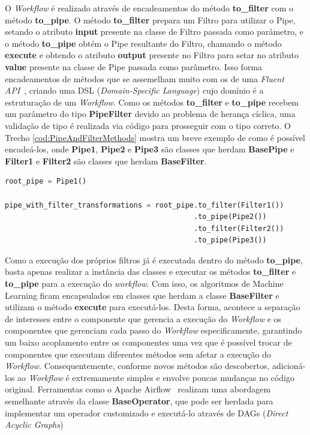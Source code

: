 \documentclass[portugues]{ic-tese}
\begin{document}
O \textit{Workflow} é realizado através de encadeamentos do método \textbf{to\_filter} com o método \textbf{to\_pipe}. O método \textbf{to\_filter} prepara um Filtro para utilizar o Pipe, setando o atributo \textbf{input} presente na classe de Filtro passada como parâmetro, e o método \textbf{to\_pipe} obtém o Pipe resultante do Filtro, chamando o método \textbf{execute} e obtendo o atributo \textbf{output} presente no Filtro para setar no atributo \textbf{value} presente na classe de Pipe passada como parâmetro. Isso forma encadeamentos de métodos que se assemelham muito com os de uma \textit{Fluent API}~\citep{Fowler_2005}, criando uma DSL (\textit{Domain-Specific Language}) cujo domínio é a estruturação de um \textit{Workflow}. Como os métodos \textbf{to\_filter} e \textbf{to\_pipe} recebem um parâmetro do tipo \textbf{PipeFilter} devido ao problema de herança cíclica, uma validação de tipo é realizada via código para prosseguir com o tipo correto. O Trecho \ref{cod:PipeAndFilterMethods} mostra um breve exemplo de como é possível encadeá-los, onde \textbf{Pipe1}, \textbf{Pipe2} e \textbf{Pipe3} são classes que herdam \textbf{BasePipe} e \textbf{Filter1} e \textbf{Filter2} são classes que herdam \textbf{BaseFilter}.

\begin{lstlisting}[language=Python, caption=Exemplo de uso do \textit{Framework} para encadeamento dos Workflows,label=cod:PipeAndFilterMethods]
root_pipe = Pipe1()

pipe_with_filter_transformations = root_pipe.to_filter(Filter1())
											.to_pipe(Pipe2())
											.to_filter(Filter2())
											.to_pipe(Pipe3())
\end{lstlisting}

Como a execução dos próprios filtros já é executada dentro do método \textbf{to\_pipe}, basta apenas realizar a instância das classes e executar os métodos \textbf{to\_filter} e \textbf{to\_pipe} para a execução do \textit{workflow}. Com isso, os algoritmos de Machine Learning ficam encapsulados em classes que herdam a classe \textbf{BaseFilter} e utilizam o método \textbf{execute} para executá-los. Desta forma, acontece a separação de interesses entre o componente que gerencia a execução do \textit{Workflow} e os componentes que gerenciam cada passo do \textit{Workflow} especificamente, garantindo um baixo acoplamento entre os componentes uma vez que é possível trocar de componentes que executam diferentes métodos sem afetar a execução do \textit{Workflow}. Consequentemente, conforme novos métodos são descobertos, adicioná-los ao \textit{Workflow} é extremamente simples e envolve poucas mudanças no código original. Ferramentas como o Apache Airflow~\citep{ApacheAirflow_2022} realizam uma abordagem semelhante através da classe \textbf{BaseOperator}, que pode ser herdada para implementar um operador customizado e executá-lo através de DAGs (\textit{Direct Acyclic Graphs})
\end{document}
